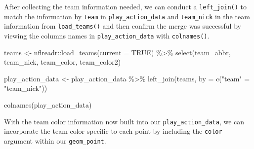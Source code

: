 \documentclass[
  letterpaper,
]{krantz}
\newenvironment{Shaded}{\begin{snugshade}}{\end{snugshade}}
\newcommand{\AttributeTok}[1]{\textcolor[rgb]{0.40,0.45,0.13}{#1}}
\newcommand{\ConstantTok}[1]{\textcolor[rgb]{0.56,0.35,0.01}{#1}}
\newcommand{\FunctionTok}[1]{\textcolor[rgb]{0.28,0.35,0.67}{#1}}
\newcommand{\NormalTok}[1]{\textcolor[rgb]{0.00,0.23,0.31}{#1}}
\newcommand{\OtherTok}[1]{\textcolor[rgb]{0.00,0.23,0.31}{#1}}
\newcommand{\SpecialCharTok}[1]{\textcolor[rgb]{0.37,0.37,0.37}{#1}}
\newcommand{\StringTok}[1]{\textcolor[rgb]{0.13,0.47,0.30}{#1}}
\begin{document}
After collecting the team information needed, we can conduct a
\texttt{left\_join()} to match the information by \texttt{team} in
\texttt{play\_action\_data} and \texttt{team\_nick} in the team
information from \texttt{load\_teams()} and then confirm the merge was
successful by viewing the columns names in \texttt{play\_action\_data}
with \texttt{colnames()}.

\begin{Shaded}
\begin{Highlighting}[]
\NormalTok{teams }\OtherTok{\textless{}{-}}\NormalTok{ nflreadr}\SpecialCharTok{::}\FunctionTok{load\_teams}\NormalTok{(}\AttributeTok{current =} \ConstantTok{TRUE}\NormalTok{) }\SpecialCharTok{\%\textgreater{}\%}
  \FunctionTok{select}\NormalTok{(team\_abbr, team\_nick, team\_color, team\_color2)}

\NormalTok{play\_action\_data }\OtherTok{\textless{}{-}}\NormalTok{ play\_action\_data }\SpecialCharTok{\%\textgreater{}\%}
  \FunctionTok{left\_join}\NormalTok{(teams, }\AttributeTok{by =} \FunctionTok{c}\NormalTok{(}\StringTok{"team"} \OtherTok{=} \StringTok{"team\_nick"}\NormalTok{))}

\FunctionTok{colnames}\NormalTok{(play\_action\_data)}
\end{Highlighting}
\end{Shaded}

With the team color information now built into our
\texttt{play\_action\_data}, we can incorporate the team color specific
to each point by including the \texttt{color} argument within our
\texttt{geom\_point}.

\begin{Shaded}
\end{Shaded}
\end{document}
